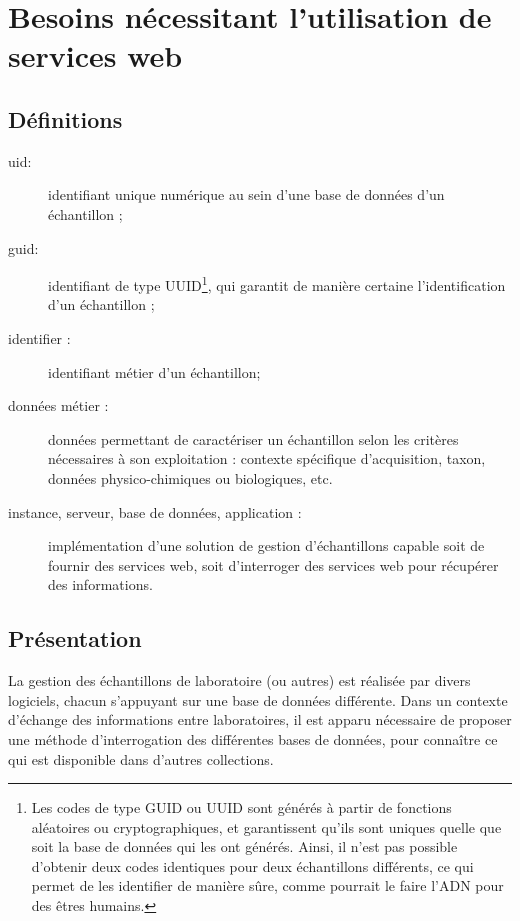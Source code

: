 \chapter{Besoins nécessitant l'utilisation de services web}

\section{Définitions}

\begin{description}
\item[uid:] identifiant unique numérique au sein d'une base de données d'un échan\-tillon ;
\item[guid:] identifiant de type UUID\footnote{Les codes de type GUID ou UUID sont générés à partir de fonctions aléatoires ou cryptographiques, et garantissent qu'ils sont uniques quelle que soit la base de données qui les ont générés. Ainsi, il n'est pas possible d'obtenir deux codes identiques pour deux échantillons différents, ce qui permet de les identifier de manière sûre, comme pourrait le faire l'ADN pour des êtres humains.}, qui garantit de manière certaine l'identification d'un échantillon ;
\item [identifier :] identifiant \og métier \fg{} d'un échantillon;
\item [données \og métier \fg{} :] données permettant de caractériser un échantillon selon les critères nécessaires à son exploitation : contexte spécifique d'acquisition, taxon, données physico-chimiques ou biologiques, etc.
\item [instance, serveur, base de données, application :] implémentation d'une solution de gestion d'échantillons capable soit de fournir des services web, soit d'interroger des services web pour récupérer des informations.
\end{description}
\section{Présentation}

La gestion des échantillons de laboratoire (ou autres) est réalisée par divers logiciels, chacun s'appuyant sur une base de données différente. Dans un contexte d'échange des informations entre laboratoires, il est apparu nécessaire de proposer une méthode d'interrogation des différentes bases de données, pour connaître ce qui est disponible dans d'autres collections.

